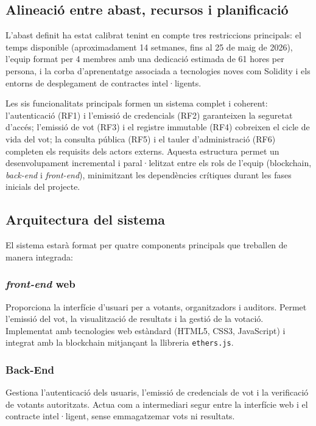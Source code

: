 \documentclass[12pt,a4paper,catalan]{article}
\begin{document}
\subsection{Alineació entre abast, recursos i planificació}

L'abast definit ha estat calibrat tenint en compte tres restriccions principals: el temps disponible (aproximadament 14 setmanes, fins al 25 de maig de 2026), l'equip format per 4 membres amb una dedicació estimada de 61 hores per persona, i la corba d'aprenentatge associada a tecnologies noves com Solidity i els entorns de desplegament de contractes intel·ligents.

Les sis funcionalitats principals formen un sistema complet i coherent: l'autenticació (RF1) i l'emissió de credencials (RF2) garanteixen la seguretat d'accés; l'emissió de vot (RF3) i el registre immutable (RF4) cobreixen el cicle de vida del vot; la consulta pública (RF5) i el tauler d'administració (RF6) completen els requisits dels actors externs. Aquesta estructura permet un desenvolupament incremental i paral·lelitzat entre els rols de l'equip (blockchain, \textit{back-end} i \textit{front-end}), minimitzant les dependències crítiques durant les fases inicials del projecte.

\subsection{Arquitectura del sistema}

El sistema estarà format per quatre components principals que treballen de manera integrada:

\subsubsection*{\textit{front-end} web}
Proporciona la interfície d'usuari per a votants, organitzadors i auditors. Permet l'emissió del vot, la visualització de resultats i la gestió de la votació. Implementat amb tecnologies web estàndard (HTML5, CSS3, JavaScript) i integrat amb la blockchain mitjançant la llibreria \texttt{ethers.js}.

\subsubsection*{Back-End}
Gestiona l'autenticació dels usuaris, l'emissió de credencials de vot i la verificació de votants autoritzats. Actua com a intermediari segur entre la interfície web i el contracte intel·ligent, sense emmagatzemar vots ni resultats.
\end{document}
